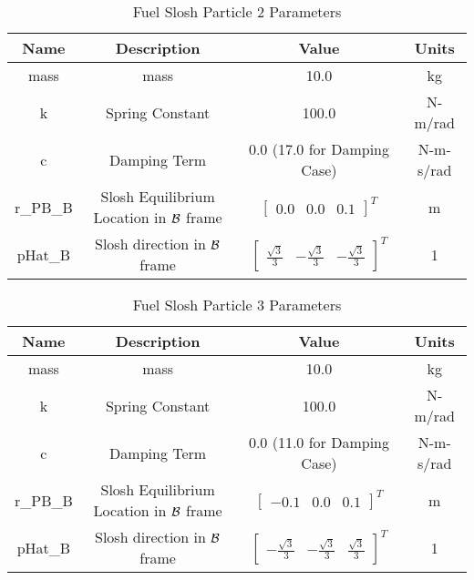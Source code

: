 \begin{table}[htbp]
	\caption{Fuel Slosh Particle 2 Parameters}
	\label{tab:slosh2}
	\centering \fontsize{10}{10}\selectfont
	\begin{tabular}{| c | c | c | c |} %
		\hline
		\textbf{Name}  & \textbf{Description}  & \textbf{Value} & \textbf{Units} \\
		\hline
		mass  & mass & 10.0 & kg \\
		\hline
		k & Spring Constant & 100.0 & N-m/rad \\
		\hline
		c & Damping Term & 0.0 (17.0 for Damping Case) & N-m-s/rad \\
		\hline
		r\_PB\_B & Slosh Equilibrium Location in $\cal{B}$ frame & $\begin{bmatrix}
		0.0 & 0.0 & 0.1 \end{bmatrix}^T$ & m \\
		\hline
		pHat\_B & Slosh direction in $\cal{B}$ frame & $\begin{bmatrix}
		\frac{\sqrt{3}}{3} & -\frac{\sqrt{3}}{3} & -\frac{\sqrt{3}}{3} \end{bmatrix}^T$ & 1 \\
		\hline
	\end{tabular}
\end{table}

\begin{table}[htbp]
	\caption{Fuel Slosh Particle 3 Parameters}
	\label{tab:slosh3}
	\centering \fontsize{10}{10}\selectfont
	\begin{tabular}{| c | c | c | c |} %
		\hline
		\textbf{Name}  & \textbf{Description}  & \textbf{Value} & \textbf{Units} \\
		\hline
		mass  & mass & 10.0 & kg \\
		\hline
		k & Spring Constant & 100.0 & N-m/rad \\
		\hline
		c & Damping Term & 0.0 (11.0 for Damping Case) & N-m-s/rad \\
		\hline
		r\_PB\_B & Slosh Equilibrium Location in $\cal{B}$ frame & $\begin{bmatrix}
		-0.1 & 0.0 & 0.1 \end{bmatrix}^T$ & m \\
		\hline
		pHat\_B & Slosh direction in $\cal{B}$ frame & $\begin{bmatrix}
		-\frac{\sqrt{3}}{3} & -\frac{\sqrt{3}}{3} & \frac{\sqrt{3}}{3} \end{bmatrix}^T$ & 1 \\
		\hline
	\end{tabular}
\end{table}

